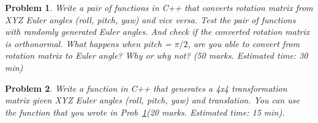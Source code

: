\documentclass[twocolumn]{article}
\newtheorem{prob}{Problem}
\newif\ifsol
\begin{document}
\fi

\begin{prob}
  Write a pair of functions in C++ that converts rotation matrix from XYZ Euler
angles (roll, pitch, yaw) and vice versa. Test the pair of functions with
randomly generated Euler angles. And check if the converted rotation matrix is
orthonormal. What happens when pitch = $\pi/2$, are you able to convert from
rotation matrix to Euler angle? Why or why not? (50 marks. Estimated time: 30 min)
\label{prob:euler-to-rotmat}
\end{prob}

\ifsol
\paragraph*{Solution}
Please check function \verb|euler_to_rotmat| and \verb|rotmat_to_euler_rpy| in
\verb|hw1.cpp|. When pitch $=\frac{\pi}{2}$ works some of the time, but not all the time because of the
Gimbal lock matrix to Euler angle conversion has multiple possible solutions.
\fi

\begin{prob}
  Write a function in C++ that generates a 4x4 transformation matrix given XYZ Euler
  angles (roll, pitch, yaw) and translation. You can use the function that you
  wrote in Prob~\ref{prob:euler-to-rotmat}(20 marks. Estimated time: 15 min).
\end{prob}

\ifsol
\paragraph*{Solution}
Please check function \verb|transformation_matrix| in \verb|hw1.cpp|
\fi
\end{document}

